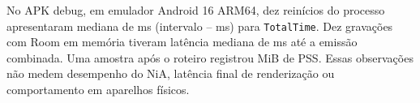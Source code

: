 No APK debug, em emulador Android 16 ARM64, dez reinícios do processo
apresentaram mediana de \StartupMedian{} ms
(intervalo \StartupMin{}--\StartupMax{} ms) para \texttt{Total\allowbreak Time}.
Dez gravações com Room em memória tiveram latência mediana de \FavoriteMedian{}
ms até a emissão combinada. Uma amostra após o roteiro registrou
\MemoryPss{} MiB de PSS. Essas observações não medem desempenho do NiA,
latência final de renderização ou comportamento em aparelhos físicos.
